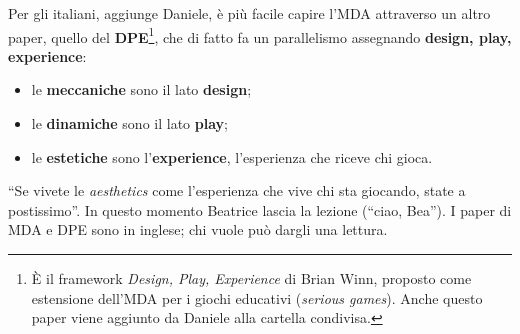 Per gli italiani, aggiunge Daniele, è più facile capire l'MDA attraverso un
altro paper, quello del \textbf{DPE}\footnote{È il framework \emph{Design, Play,
Experience} di Brian Winn, proposto come estensione dell'MDA per i giochi
educativi (\emph{serious games}). Anche questo paper viene aggiunto da Daniele
alla cartella condivisa.}, che di fatto fa un parallelismo assegnando
\textbf{design, play, experience}:
\begin{itemize}
  \item le \textbf{meccaniche} sono il lato \textbf{design};
  \item le \textbf{dinamiche} sono il lato \textbf{play};
  \item le \textbf{estetiche} sono l'\textbf{experience}, l'esperienza che riceve
        chi gioca.
\end{itemize}
``Se vivete le \emph{aesthetics} come l'esperienza che vive chi sta giocando,
state a postissimo''. In questo momento Beatrice lascia la lezione (``ciao,
Bea''). I paper di MDA e DPE sono in inglese; chi vuole può dargli una lettura.

